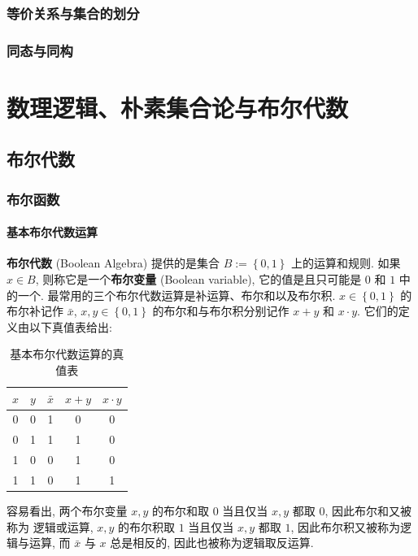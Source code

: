 \documentclass[10pt,UTF8]{book} %
\begin{document}
\section{等价关系与集合的划分}
\section{同态与同构}

\newpage
\thispagestyle{empty}

\part{数理逻辑、朴素集合论与布尔代数}


\chapter{布尔代数}

\section{布尔函数}

\subsection{基本布尔代数运算}

\textbf{布尔代数} (Boolean Algebra) 提供的是集合 $B := \left\{ 0,1 \right\}$ 上的运算和规则.
如果 $x \in B$, 则称它是一个\textbf{布尔变量} (Boolean variable),
它的值是且只可能是 $0$ 和 $1$ 中的一个.
最常用的三个布尔代数运算是补运算、布尔和以及布尔积. $x \in \left\{0,1\right\}$
的布尔补记作 $\bar x$, $x, y \in \left\{ 0, 1 \right\}$ 的布尔和与布尔积分别记作
$x+y$ 和 $x \cdot y$. 它们的定义由以下真值表给出:
\begin{table}[H]
    \centering
    \caption{基本布尔代数运算的真值表}
    \begin{tabular}{cc|ccc}
        \toprule
        $x$ & $y$ & $\bar x$ & $x+y$ & $x \cdot y$ \\ 
        \midrule
        0 & 0 & 1 & 0 & 0 \\ 
        0 & 1 & 1 & 1 & 0 \\ 
        1 & 0 & 0 & 1 & 0 \\ 
        1 & 1 & 0 & 1 & 1 \\ 
        \bottomrule
    \end{tabular}
\end{table}
容易看出, 两个布尔变量 $x,y$ 的布尔和取 $0$ 当且仅当 $x,y$ 都取 $0$, 因此布尔和又被称为
逻辑或运算, $x, y$ 的布尔积取 $1$ 当且仅当 $x, y$ 都取 $1$, 因此布尔积又被称为逻辑与运算,
而 $\bar x$ 与 $x$ 总是相反的, 因此也被称为逻辑取反运算.
\end{document}
